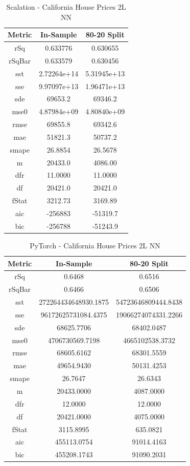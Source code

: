 \documentclass{article}
\begin{document}
\begin{table}[H]
\centering
\caption{Scalation - California House Prices 2L NN}
\label{tab:Scalation - California House Prices 2L NN}
\begin{tabular}{|c|c|c|} \hline 
Metric & In-Sample & 80-20 Split \\ \hline \hline 
rSq &0.633776 & 0.630655 \\ \hline 
rSqBar &0.633579 &      0.630456 \\ \hline 
sst &2.72264e+14 &      5.31945e+13 \\ \hline 
sse &9.97097e+13 &      1.96471e+13 \\ \hline 
sde &69653.2 &  69346.2 \\ \hline 
mse0 &4.87984e+09 &     4.80840e+09 \\ \hline 
rmse &69855.8 & 69342.6 \\ \hline 
mae &51821.3 &  50737.2 \\ \hline 
smape &26.8854 &        26.5678 \\ \hline 
m &20433.0 &    4086.00 \\ \hline 
dfr &11.0000 &  11.0000 \\ \hline 
df &20421.0 &   20421.0 \\ \hline 
fStat &3212.73 &        3169.89 \\ \hline 
aic &-256883 &  -51319.7 \\ \hline 
bic &-256788 &  -51243.9 \\ \hline 
\end{tabular}
\end{table}

\begin{table}[H]
\centering
\caption{PyTorch - California House Prices 2L NN}
\label{tab:PyTorch - California House Prices 2L NN}
\begin{tabular}{|c|c|c|}\hline
Metric & In-Sample & 80-20 Split \\ \hline \hline
rSq & 0.6468 & 0.6516 \\ \hline
rSqBar & 0.6466 & 0.6506 \\ \hline
sst & 272264434648930.1875 & 54723646809444.8438 \\ \hline
sse & 96172625731084.4375 & 19066274074331.2266 \\ \hline
sde & 68625.7706 & 68402.0487 \\ \hline
mse0 & 4706730569.7198 & 4665102538.3732 \\ \hline
rmse & 68605.6162 & 68301.5559 \\ \hline
mae & 49654.9430 & 50131.4253 \\ \hline
smape & 26.7647 & 26.6343 \\ \hline
m & 20433.0000 & 4087.0000 \\ \hline
dfr & 12.0000 & 12.0000 \\ \hline
df & 20421.0000 & 4075.0000 \\ \hline
fStat & 3115.8995 & 635.0821 \\ \hline
aic & 455113.0754 & 91014.4163 \\ \hline
bic & 455208.1743 & 91090.2031 \\ \hline
\end{tabular}
\end{table}
\end{document}
